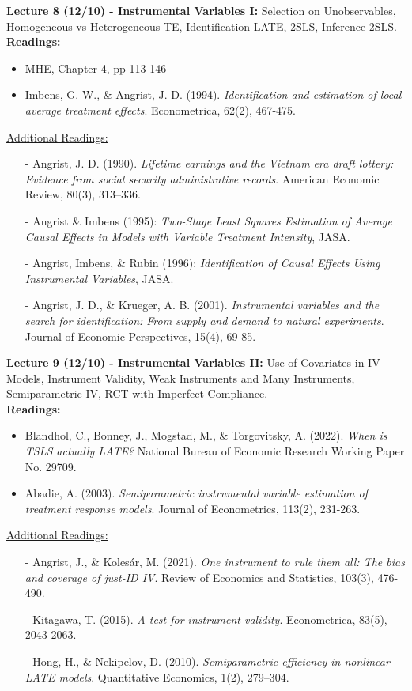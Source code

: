 \documentclass[12pt]{article}
\begin{document}
\textbf{Lecture 8 (12/10) - Instrumental Variables I:} Selection on Unobservables, Homogeneous vs Heterogeneous TE, Identification LATE, 2SLS, Inference 2SLS.\\
\textbf{Readings:}
\begin{itemize}
    \item MHE, Chapter 4, pp 113-146
    \item Imbens, G. W., \& Angrist, J. D. (1994). \emph{Identification and estimation of local average treatment effects}. Econometrica, 62(2), 467-475.
\end{itemize}
\underline{Additional Readings:}
\begin{itemize}
    \item[-] Angrist, J. D. (1990). \emph{Lifetime earnings and the Vietnam era draft lottery: Evidence from social security administrative records}. American Economic Review, 80(3), 313–336.
    \item[-] Angrist \& Imbens (1995): \emph{Two-Stage Least Squares Estimation of Average Causal Effects in Models with Variable Treatment Intensity}, JASA.
    \item[-] Angrist, Imbens, \& Rubin (1996): \emph{Identification of Causal Effects Using Instrumental Variables}, JASA.
    \item[-] Angrist, J. D., \& Krueger, A. B. (2001). \emph{Instrumental variables and the search for identification: From supply and demand to natural experiments}. Journal of Economic Perspectives, 15(4), 69-85.
\end{itemize}

\textbf{Lecture 9 (12/10) - Instrumental Variables II:} Use of Covariates in IV Models, Instrument Validity, Weak Instruments and Many Instruments, Semiparametric IV, RCT with Imperfect Compliance.\\
\textbf{Readings:}
\begin{itemize}
    \item Blandhol, C., Bonney, J., Mogstad, M., \& Torgovitsky, A. (2022). \emph{When is TSLS actually LATE?} National Bureau of Economic Research Working Paper No. 29709.
    \item Abadie, A. (2003). \emph{Semiparametric instrumental variable estimation of treatment response models}. Journal of Econometrics, 113(2), 231-263.
\end{itemize}
\underline{Additional Readings:}
\begin{itemize}
    \item[-] Angrist, J., \& Kolesár, M. (2021). \emph{One instrument to rule them all: The bias and coverage of just-ID IV}. Review of Economics and Statistics, 103(3), 476-490.
    \item[-] Kitagawa, T. (2015). \emph{A test for instrument validity}. Econometrica, 83(5), 2043-2063.
    \item[-] Hong, H., \& Nekipelov, D. (2010). \emph{Semiparametric efficiency in nonlinear LATE models}. Quantitative Economics, 1(2), 279–304.
\end{itemize}
\end{document}
